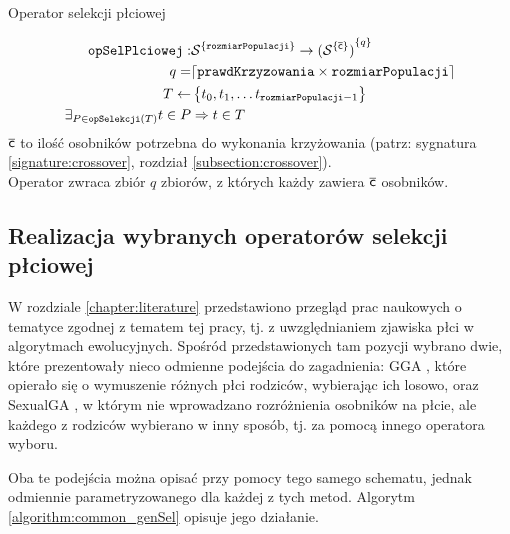 \documentclass[./FM_mgr.tex]{subfiles}
\begin{document}
\begin{signature}
	\caption{Operator selekcji płciowej \label{signature:genSel}}
	\begin{align}
	\mathtt{opSelPlciowej}: &{ \mathcal{S}}^{ \{ \mathtt{rozmiarPopulacji}  \}} \rightarrow { ( {\mathcal{S}  }^{ \{ \mathsf{\overline{c}} \}} ) }^{ \{ q \}} \\
	q = & \lceil \mathtt{prawdKrzyzowania} \times \mathtt{rozmiarPopulacji} \rceil \\
	T \gets &\left\{ t_0, t_1, \ldots t_{\mathtt{rozmiarPopulacji}-1} \right\} \\
	\exists_{P \in \mathtt{opSelekcji}(T)} t \in P &\Rightarrow t \in T
	\end{align}	
	$\mathsf{\overline{c}}$ to ilość osobników potrzebna do wykonania krzyżowania (patrz: sygnatura \ref{signature:crossover}, rozdział \ref{subsection:crossover}). \\
	Operator zwraca zbiór $q$ zbiorów, z których każdy zawiera $\mathsf{\overline{c}}$ osobników.
\end{signature}

\subsection{Realizacja wybranych operatorów selekcji płciowej} \label{subsection:literatureRealization}

W rozdziale \ref{chapter:literature} przedstawiono przegląd prac naukowych o tematyce zgodnej z tematem tej pracy, tj. z uwzględnianiem zjawiska płci w algorytmach ewolucyjnych.
Spośród przedstawionych tam pozycji wybrano dwie, które prezentowały nieco odmienne podejścia do zagadnienia: GGA \cite{GGA}, które opierało się o wymuszenie różnych płci rodziców, wybierając ich losowo, oraz SexualGA \cite{SexualGA}, w którym nie wprowadzano rozróżnienia osobników na płcie, ale każdego z rodziców wybierano w inny sposób, tj. za pomocą innego operatora wyboru.

Oba te podejścia można opisać przy pomocy tego samego schematu, jednak odmiennie parametryzowanego dla każdej z tych metod. Algorytm \ref{algorithm:common_genSel} opisuje jego działanie.
\end{document}
